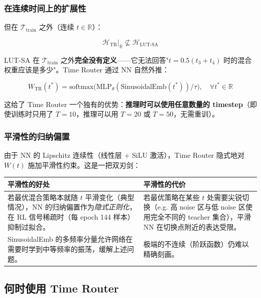 \documentclass[11pt,a4paper]{article}
\newcommand{\softmax}{\mathrm{softmax}}
\newcommand{\R}{\mathbb{R}}
\begin{document}
\subsubsection{在连续时间上的扩展性}

但在 $\mathcal{T}_{\text{train}}$ 之外（连续 $t \in \R$）：

\begin{equation}
\mathcal{H}_{\text{TR}}\big|_{\R} \not\subseteq \mathcal{H}_{\text{LUT-SA}}
\end{equation}

LUT-SA 在 $\mathcal{T}_{\text{train}}$ 之外\textbf{完全没有定义}——它无法回答"$t = 0.5(t_3 + t_4)$ 时的混合权重应该是多少"。Time Router 通过 NN 自然外推：

\begin{equation}
W_{\text{TR}}(t^*) = \softmax\bigl(\text{MLP}_\theta(\text{SinusoidalEmb}(t^*)) / \tau\bigr), \quad \forall t^* \in \R
\end{equation}

这给了 Time Router 一个独有的优势：\textbf{推理时可以使用任意数量的 timestep}（即使训练时只用了 $T=10$，推理可以用 $T=20$ 或 $T=50$，无需重训）。

\subsubsection{平滑性的归纳偏置}

由于 NN 的 Lipschitz 连续性（线性层 + SiLU 激活），Time Router 隐式地对 $W(t)$ 施加平滑性约束。这是一把双刃剑：

\begin{center}
\begin{tabular}{p{6cm}|p{6cm}}
\toprule
\textbf{平滑性的好处} & \textbf{平滑性的代价} \\
\midrule
若最优混合策略本就随 $t$ 平滑变化（典型情况），NN 的归纳偏置作为\emph{隐式正则化}，在 RL 信号稀疏时（每 epoch 144 样本）抑制过拟合。 &
若最优策略在某些 $t$ 处需要尖锐切换（e.g. 高 noise 区与低 noise 区使用完全不同的 teacher 集合），平滑 NN 在切换点附近的表达受限。 \\
\midrule
SinusoidalEmb 的多频率分量允许网络在需要时学到中等频率的振荡，缓解上述问题。 &
极端的不连续（阶跃函数）仍难以精确刻画。
\\
\bottomrule
\end{tabular}
\end{center}

\subsection{何时使用 Time Router}
\end{document}
